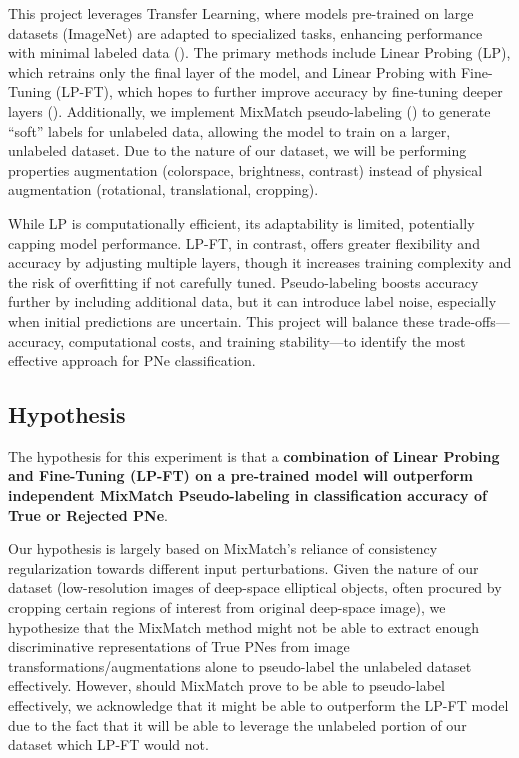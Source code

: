 \documentclass{article}
\begin{document}
This project leverages Transfer Learning, where models pre-trained on large datasets (ImageNet) are adapted to specialized tasks, enhancing performance with minimal labeled data (\cite{pan2010survey}). The primary methods include Linear Probing (LP), which retrains only the final layer of the model, and  Linear Probing with Fine-Tuning (LP-FT),  which hopes to further improve accuracy by fine-tuning deeper layers (\cite{kumar2022lpft}). Additionally, we implement MixMatch pseudo-labeling (\cite{lee2013pseudo}) to generate ``soft'' labels for unlabeled data, allowing the model to train on a larger, unlabeled dataset. Due to the nature of our dataset, we will be performing properties augmentation (colorspace, brightness, contrast) instead of physical augmentation (rotational, translational, cropping).

While LP is computationally efficient, its adaptability is limited, potentially capping model performance. LP-FT, in contrast, offers greater flexibility and accuracy by adjusting multiple layers, though it increases training complexity and the risk of overfitting if not carefully tuned. Pseudo-labeling boosts accuracy further by including additional data, but it can introduce label noise, especially when initial predictions are uncertain. This project will balance these trade-offs---accuracy, computational costs, and training stability---to identify the most effective approach for PNe classification.

\subsection{Hypothesis}

The hypothesis for this experiment is that a \textbf{combination of Linear Probing and Fine-Tuning (LP-FT) on a pre-trained model will outperform independent MixMatch Pseudo-labeling in classification accuracy of True or Rejected PNe}. 

Our hypothesis is largely based on MixMatch's reliance of consistency regularization towards different input perturbations. Given the nature of our dataset (low-resolution images of deep-space elliptical objects, often procured by cropping certain regions of interest from original deep-space image), we hypothesize that the MixMatch method might not be able to extract enough discriminative representations of True PNes from image transformations/augmentations alone to pseudo-label the unlabeled dataset effectively. However, should MixMatch prove to be able to pseudo-label effectively, we acknowledge that it might be able to outperform the LP-FT model due to the fact that it will be able to leverage the unlabeled portion of our dataset which LP-FT would not.
\end{document}
